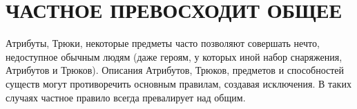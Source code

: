 \section{ЧАСТНОЕ ПРЕВОСХОДИТ ОБЩЕЕ}
Атрибуты, Трюки, некоторые предметы часто позволяют совершать нечто, недоступное обычным людям (даже героям, у которых иной набор снаряжения, Атрибутов и Трюков). Описания Атрибутов, Трюков, предметов и способностей существ могут противоречить основным правилам, создавая исключения. В таких случаях частное правило всегда превалирует над общим.